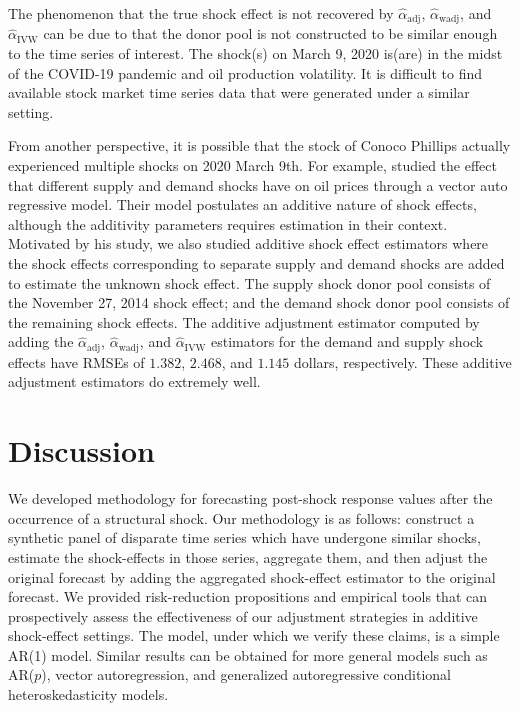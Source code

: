 \documentclass[11pt]{article}
\theoremstyle{definition}
\begin{document}
The phenomenon that the true shock effect is not recovered by $\hat{\alpha}_{\text{adj}}$, $\hat{\alpha}_{\text{wadj}}$, and $\hat{\alpha}_{\text{IVW}}$ can be due to that the donor pool is not constructed to be similar enough to the time series of interest. The shock(s) on March 9, 2020 is(are) in the midst of the COVID-19 pandemic and oil production volatility. It is difficult to find available stock market time series data that were generated under a similar setting.  


From another perspective, it is possible that the stock of Conoco Phillips actually experienced multiple shocks on 2020 March 9th. For example, \citet{kilian2009not} studied the effect that different supply and demand shocks have on oil prices through a vector auto regressive model. Their model postulates an additive nature of shock effects, although the additivity parameters requires estimation in their context. Motivated by his study, we also studied additive shock effect estimators where the shock effects corresponding to separate supply and demand shocks are added to estimate the unknown shock effect. The supply shock donor pool consists of the November 27, 2014 shock effect; and the demand shock donor pool consists of the remaining shock effects. The additive adjustment estimator computed by adding the $\hat{\alpha}_{\text{adj}}$, $\hat{\alpha}_{\text{wadj}}$, and $\hat{\alpha}_{\text{IVW}}$ estimators for the demand and supply shock effects have  RMSEs of $1.382$, $2.468$, and $1.145$ dollars, respectively. These additive adjustment estimators do extremely well. 






\section{Discussion}
\label{discussion}

We developed methodology for forecasting post-shock response values after the occurrence of a structural shock. Our methodology is as follows: construct a synthetic panel of disparate time series which have undergone similar shocks, estimate the shock-effects in those series, aggregate them, and then adjust the original forecast by adding the aggregated shock-effect estimator to the original forecast. We provided risk-reduction propositions and empirical tools that can prospectively assess the effectiveness of our adjustment strategies in additive shock-effect settings. The model, under which we verify these claims, is a simple AR(1) model. Similar results can be obtained for more general models such as AR($p$), vector autoregression, and generalized autoregressive conditional heteroskedasticity models. %
\end{document}
